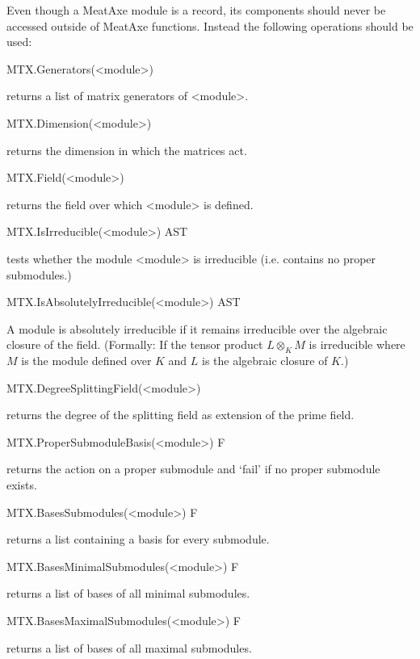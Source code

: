 
Even though a MeatAxe module is a record, its components should never be
accessed outside of MeatAxe functions. Instead the following operations
should be used:

\>MTX.Generators(<module>)

returns a list of matrix generators of <module>.

\>MTX.Dimension(<module>)

returns the dimension in which the matrices act.

\>MTX.Field(<module>)

returns the field over which <module> is defined.


\>MTX.IsIrreducible(<module>) AST

tests whether the module <module> is irreducible (i.e. contains no proper
submodules.)

\>MTX.IsAbsolutelyIrreducible(<module>) AST

A module is absolutely irreducible if it remains irreducible over the
algebraic closure of the field. (Formally: If the tensor product $L\otimes_K
M$ is irreducible where $M$ is the module defined over $K$ and $L$ is the
algebraic closure of $K$.)

\>MTX.DegreeSplittingField(<module>)

returns the degree of the splitting field as extension of the prime field.


\>MTX.ProperSubmoduleBasis(<module>) F

returns the action on a proper submodule and `fail' if no proper submodule
exists.

\>MTX.BasesSubmodules(<module>) F

returns a list containing a basis for every submodule.

\>MTX.BasesMinimalSubmodules(<module>) F

returns a list of bases of all minimal submodules.

\>MTX.BasesMaximalSubmodules(<module>) F

returns a list of bases of all maximal submodules.

